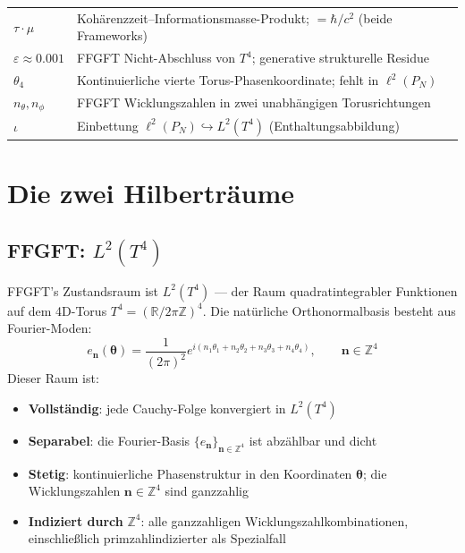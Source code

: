 \begin{center}
{{\begin{tabular}{p{3.5cm}p{9cm}}
$\tau\cdot\mu$ & Kohärenzzeit--Informationsmasse-Produkt; $= \hbar/c^2$ (beide Frameworks) \\
$\varepsilon \approx 0.001$ & FFGFT Nicht-Abschluss von $T^4$; generative strukturelle Residue \\
$\theta_4$ & Kontinuierliche vierte Torus-Phasenkoordinate; fehlt in $\ell^2(P_N)$ \\
$n_\theta, n_\phi$ & FFGFT Wicklungszahlen in zwei unabhängigen Torusrichtungen \\
$\iota$ & Einbettung $\ell^2(P_N) \hookrightarrow L^2(T^4)$ (Enthaltungsabbildung) \\
\bottomrule
\end{tabular}%
}
}
\end{center}


\clearpage

\section{Die zwei Hilberträume}

\subsection{FFGFT: \texorpdfstring{$L^2(T^4)$}{L2(T4)}}

FFGFT's Zustandsraum ist $L^2(T^4)$ — der Raum quadratintegrabler Funktionen
auf dem 4D-Torus $T^4 = (\mathbb{R}/2\pi\mathbb{Z})^4$. Die natürliche
Orthonormalbasis besteht aus Fourier-Moden:
\begin{equation}
  e_{\mathbf{n}}(\symbf{\theta}) = \frac{1}{(2\pi)^2}
  e^{i(n_1\theta_1 + n_2\theta_2 + n_3\theta_3 + n_4\theta_4)},
  \qquad \mathbf{n} \in \mathbb{Z}^4
  \tag{244.1}
\end{equation}
Dieser Raum ist:
\begin{itemize}
  \item \textbf{Vollständig}: jede Cauchy-Folge konvergiert in $L^2(T^4)$
  \item \textbf{Separabel}: die Fourier-Basis $\{e_{\mathbf{n}}\}_{\mathbf{n}\in\mathbb{Z}^4}$
    ist abzählbar und dicht
  \item \textbf{Stetig}: kontinuierliche Phasenstruktur in den Koordinaten $\symbf{\theta}$; die Wicklungszahlen $\mathbf{n}\in\mathbb{Z}^4$ sind ganzzahlig
  \item \textbf{Indiziert durch} $\mathbb{Z}^4$: alle ganzzahligen Wicklungszahlkombinationen,
    einschließlich primzahlindizierter als Spezialfall
\end{itemize}

